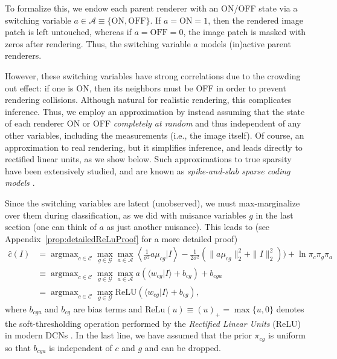 \documentclass[12pt]{article}
\DeclareMathOperator*{\argmax}{argmax}
\newcommand{\Cl}[0]{{ \mathcal{C} }}
\newcommand{\G}[0]{{ \mathcal{G} }}
\newcommand{\A}[0]{{ \mathcal{A} }}
\begin{document}
To formalize this, we endow each parent renderer with an ON/OFF state via a switching variable $a \in \A \equiv \{\textrm{ON}, \textrm{OFF} \}$. If $a=\textrm{ON}=1$, then the rendered image patch is left untouched, whereas if $a=\textrm{OFF}=0$, the image patch is masked with zeros after rendering. Thus, the switching variable $a$ models (in)active parent renderers. 

However, these switching variables have strong correlations due to the crowding out effect: if one is ON, then its neighbors must be OFF in order to prevent rendering collisions. Although natural for realistic rendering, this complicates inference. Thus, we employ an approximation by instead assuming that the state of each renderer ON or OFF \textit{completely at random} and thus independent of any other variables, including the measurements (i.e., the image itself). Of course, an approximation to real rendering, but it simplifies inference, and leads directly to rectified linear units, as we show below. Such approximations to true sparsity have been extensively studied, and are known as {\em spike-and-slab sparse coding models \cite{lucke2012closed, goodfellow2012large}}.

Since the switching variables are latent (unobserved), we must max-marginalize over them during classification, as we did with nuisance variables $g$ in the last section (one can think of $a$ as just another nuisance). This leads to (see Appendix~\ref{prop:detailedReLuProof} for a more detailed proof)
\begin{align} 
   \label{eqn:relu}
\hat{c}(I) &= \argmax_{c \in \Cl} \max_{g\in \G} \max_{a\in \A} 
	\left\langle \frac{1}{\sigma^2}  a \mu_{cg} \Big| I \right\rangle  -\frac{1}{2\sigma^2} (\| a \mu_{cg} \|_2^{2} + \| I \|_2^{2})  )  + \ln \pi_{c}\pi_{g}\pi_{a} \nonumber\\
		&\equiv \argmax_{c \in \Cl} \max_{g\in \G} \max_{a\in \A} 
		      a(\langle w_{cg} | I\rangle + b_{cg}) +  b_{cga} \nonumber\\
		 &= \argmax_{c \in \Cl} \max_{g\in \G} 
		 \textrm{ReLU}\left(\langle w_{cg} | I\rangle + b_{cg}\right),
\end{align}
where $b_{cga}$ and $b_{cg}$ are bias terms and $\textrm{ReLu}(u) \equiv (u)_+ = \max\{u,0\}$ denotes the soft-thresholding operation performed by the {\it Rectified Linear Units} (ReLU) in modern DCNs \cite{dahl2013improving}. In the last line, we have assumed that the prior $\pi_{cg}$ is uniform so that $b_{cga}$ is independent of $c$ and $g$ and can be dropped.
\end{document}
